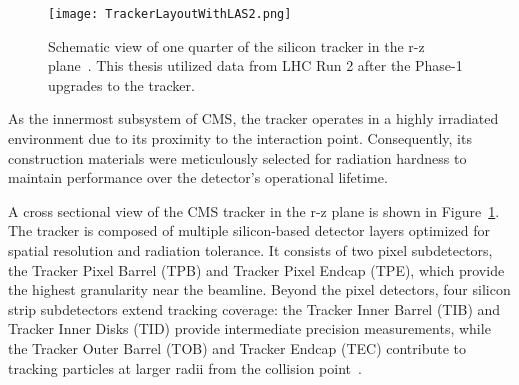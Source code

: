 \begin{figure}[!ht]
    \begin{center}
        \texttt{[image: TrackerLayoutWithLAS2.png]}
        \caption{Schematic view of one quarter of the silicon tracker in the r-z plane~\cite{Adam:2748381}. This thesis utilized data from LHC Run 2 after the Phase-1 upgrades to the tracker.}
        \label{fig:silicontracker}
    \end{center}
\end{figure}

As the innermost subsystem of CMS, the tracker operates in a highly irradiated environment due to its proximity to the interaction point. Consequently, its construction materials were meticulously selected for radiation hardness to maintain performance over the detector’s operational lifetime.

A cross sectional view of the CMS tracker in the r-z plane is shown in Figure~\ref{fig:silicontracker}. The tracker is composed of multiple silicon-based detector layers optimized for spatial resolution and radiation tolerance. It consists of two pixel subdetectors, the Tracker Pixel Barrel (TPB) and Tracker Pixel Endcap (TPE), which provide the highest granularity near the beamline. Beyond the pixel detectors, four silicon strip subdetectors extend tracking coverage: the Tracker Inner Barrel (TIB) and Tracker Inner Disks (TID) provide intermediate precision measurements, while the Tracker Outer Barrel (TOB) and Tracker Endcap (TEC) contribute to tracking particles at larger radii from the collision point~\cite{Chatrchyan:1667597}. 



